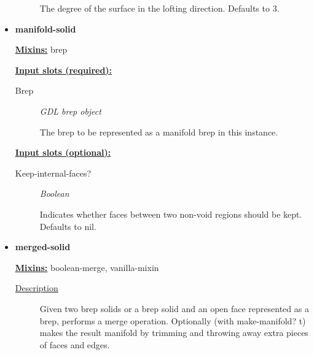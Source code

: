 \documentclass [11pt]{book}
\begin{document}
\begin{itemize}
\begin{description}
 The degree of the surface in the lofting direction. Defaults to 3.




\end{description}







\item {}
\label{prim:manifold-solid}
\textbf{manifold-solid}


\textbf{
\underline{Mixins:}} brep




\textbf{
\underline{Input slots (required):}}

\begin{description}

\item [Brep]
\emph{GDL brep object}

 The brep to be represented as a manifold brep in this instance.


\end{description}



\textbf{
\underline{Input slots (optional):}}

\begin{description}

\item [Keep-internal-faces?]
\emph{Boolean}

 Indicates whether faces between two non-void regions should be kept.
Defaults to nil.




\end{description}







\item {}
\label{prim:merged-solid}
\textbf{merged-solid}


\textbf{
\underline{Mixins:}} boolean-merge, vanilla-mixin





\begin{description}

\item [
\underline{Description}]


Given two brep solids or a brep solid and an open face represented as a brep,
performs a merge operation. Optionally (with make-manifold? t) makes the result manifold by trimming 
and throwing away extra pieces of faces and edges.




\end{description}
\end{itemize}
\end{document}
